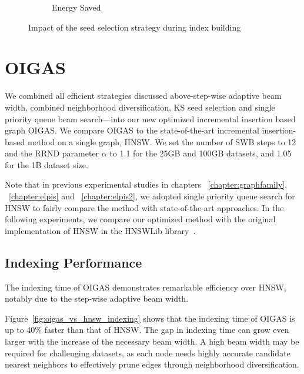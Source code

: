 \begin{figure}[!htb]
\begin{subfigure}{0.3\textwidth}
  	\label{oigas:ss:impact:joules}
		\caption{Energy Saved} 
		\label{fig:search:query:performance:25GB:hard:10p}
		\end{subfigure}
	\caption{Impact of the seed selection strategy during index building}
		\label{oigas:ss:impact}
	\end{figure}

\section{OIGAS}
We combined all efficient strategies discussed above-step-wise adaptive beam width, combined neighborhood diversification, KS seed selection and single priority queue beam search—into our new optimized incremental insertion based graph OIGAS. We compare OIGAS to the state-of-the-art incremental insertion-based method on a single graph, HNSW. We set the number of SWB steps to 12 and the RRND parameter $\alpha$ to 1.1 for the 25GB and 100GB datasets, and 1.05 for the 1B dataset size.

Note that in previous experimental studies in chapters ~\ref{chapter:graphfamily}, ~\ref{chapter:elpis} and ~\ref{chapter:elpis2}, we adopted single priority queue search for HNSW to fairly compare the method with state-of-the-art approaches. In the following experiments, we compare our optimized method with the original implementation of HNSW in the HNSWLib library~\cite{url/hnsw}.

\subsection{Indexing Performance}

The indexing time of OIGAS demonstrates remarkable efficiency over HNSW, notably due to the step-wise adaptive beam width.

Figure~\ref{fig:oigas_vs_hnsw_indexing} shows that the indexing time of OIGAS is up to 40\% faster than that of HNSW. The gap in indexing time can grow even larger with the increase of the necessary beam width. A high beam width may be required for challenging datasets, as each node needs highly accurate candidate nearest neighbors to effectively prune edges through neighborhood diversification.


